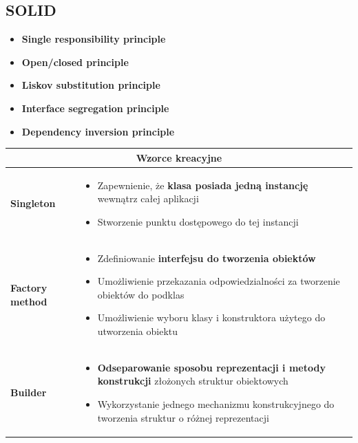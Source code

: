 \documentclass[a4paper]{article}
\begin{document}
    \subsection{SOLID}

    \begin{itemize}
        \item \textbf{Single responsibility principle}
        \item \textbf{Open/closed principle}
        \item \textbf{Liskov substitution principle}
        \item \textbf{Interface segregation principle}
        \item \textbf{Dependency inversion principle}
    \end{itemize}


    \begin{table}[H]
        \begin{center}
            \begin{tabular}{  p{3cm} p{12cm}  }
                \toprule
                \multicolumn{2}{c}{Wzorce kreacyjne}\\
                \toprule

                \textbf{Singleton}
                &
                \begin{itemize}
                    \item Zapewnienie, że \textbf{klasa posiada jedną instancję} wewnątrz całej aplikacji
                    \item Stworzenie punktu dostępowego do tej instancji
                \end{itemize}
                \\

                \cmidrule(r){1-1}\cmidrule(l){2-2}
                \textbf{Factory method}
                &
                \begin{itemize}
                    \item Zdefiniowanie \textbf{interfejsu do tworzenia obiektów}
                    \item Umożliwienie przekazania odpowiedzialności za tworzenie obiektów do podklas
                    \item Umożliwienie wyboru klasy i konstruktora użytego do utworzenia obiektu
                \end{itemize}
                \\

                \cmidrule(r){1-1}\cmidrule(l){2-2}
                \textbf{Builder}
                &
                \begin{itemize}
                    \item \textbf{Odseparowanie sposobu reprezentacji i metody konstrukcji} złożonych struktur obiektowych
                    \item Wykorzystanie jednego mechanizmu konstrukcyjnego do tworzenia struktur o różnej reprezentacji
                \end{itemize}\\


\end{tabular}
\end{center}
\end{table}
\end{document}
